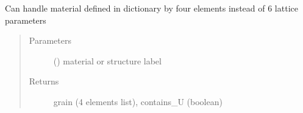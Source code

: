 \documentclass[letterpaper,10pt,english]{sphinxmanual}
\begin{document}
\begin{fulllineitems}
Can handle material defined in dictionary by four elements instead of 6 lattice parameters
\begin{quote}\begin{description}
\item[{Parameters}] \leavevmode
{} () \textendash{} material or structure label

\item[{Returns}] \leavevmode
grain (4 elements list),  contains\_U (boolean)

\end{description}\end{quote}

\end{fulllineitems}

\end{document}
